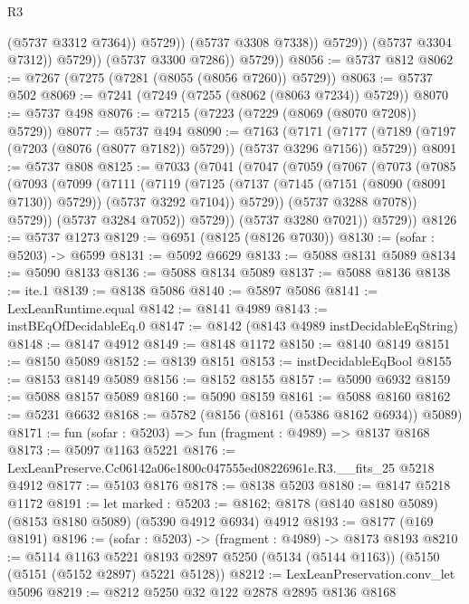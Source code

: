 \begin{lexlean}{R3}
\begin{coremodule}
                            (@5737 @3312 @7364))
                          @5729))
                      (@5737 @3308 @7338))
                    @5729))
                (@5737 @3304 @7312))
              @5729))
          (@5737 @3300 @7286))
        @5729))
@8056 := @5737 @812
@8062 := @7267 (@7275 (@7281 (@8055 (@8056 @7260)) @5729))
@8063 := @5737 @502
@8069 := @7241 (@7249 (@7255 (@8062 (@8063 @7234)) @5729))
@8070 := @5737 @498
@8076 := @7215 (@7223 (@7229 (@8069 (@8070 @7208)) @5729))
@8077 := @5737 @494
@8090 := @7163
    (@7171 (@7177 (@7189 (@7197 (@7203 (@8076 (@8077 @7182)) @5729)) (@5737 @3296 @7156)) @5729))
@8091 := @5737 @808
@8125 := @7033
    (@7041
      (@7047
        (@7059
          (@7067
            (@7073
              (@7085
                (@7093
                  (@7099
                    (@7111
                      (@7119
                        (@7125
                          (@7137 (@7145 (@7151 (@8090 (@8091 @7130)) @5729)) (@5737 @3292 @7104))
                          @5729))
                      (@5737 @3288 @7078))
                    @5729))
                (@5737 @3284 @7052))
              @5729))
          (@5737 @3280 @7021))
        @5729))
@8126 := @5737 @1273
@8129 := @6951 (@8125 (@8126 @7030))
@8130 := (sofar : @5203) -> @6599
@8131 := @5092 @6629
@8133 := @5088 @8131 @5089
@8134 := @5090 @8133
@8136 := @5088 @8134 @5089
@8137 := @5088 @8136
@8138 := ite.{1}
@8139 := @8138 @5086
@8140 := @5897 @5086
@8141 := LexLeanRuntime.equal
@8142 := @8141 @4989
@8143 := instBEqOfDecidableEq.{0}
@8147 := @8142 (@8143 @4989 instDecidableEqString)
@8148 := @8147 @4912
@8149 := @8148 @1172
@8150 := @8140 @8149
@8151 := @8150 @5089
@8152 := @8139 @8151
@8153 := instDecidableEqBool
@8155 := @8153 @8149 @5089
@8156 := @8152 @8155
@8157 := @5090 @6932
@8159 := @5088 @8157 @5089
@8160 := @5090 @8159
@8161 := @5088 @8160
@8162 := @5231 @6632
@8168 := @5782 (@8156 (@8161 (@5386 @8162 @6934)) @5089)
@8171 := fun (sofar : @5203) => fun (fragment : @4989) => @8137 @8168
@8173 := @5097 @1163 @5221
@8176 := LexLeanPreserve.Cc06142a06e1800c047555ed08226961e.R3.__fits_25 @5218 @4912
@8177 := @5103 @8176
@8178 := @8138 @5203
@8180 := @8147 @5218 @1172
@8191 := let marked : @5203 := @8162;
  @8178 (@8140 @8180 @5089) (@8153 @8180 @5089) (@5390 @4912 @6934) @4912
@8193 := @8177 (@169 @8191)
@8196 := (sofar : @5203) -> (fragment : @4989) -> @8173 @8193
@8210 := @5114
    @1163
    @5221
    @8193
    @2897
    @5250
    (@5134 (@5144 @1163))
    (@5150 (@5151 (@5152 @2897) @5221 @5128))
@8212 := LexLeanPreservation.conv_let @5096
@8219 := @8212 @5250 @32 @122 @2878 @2895 @8136 @8168

\end{coremodule}
\end{lexlean}
